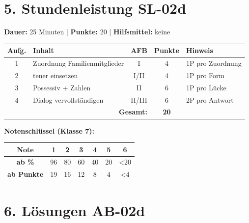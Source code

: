 \documentclass[11pt, a4paper]{article}
\begin{document}

\section*{5. Stundenleistung SL-02d}

\begin{testbox}
\textbf{Dauer:} 25 Minuten | \textbf{Punkte:} 20 | \textbf{Hilfsmittel:} keine

\vspace{1em}

\begin{tabular}{|c|l|c|c|l|}
\hline
\textbf{Aufg.} & \textbf{Inhalt} & \textbf{AFB} & \textbf{Punkte} & \textbf{Hinweis} \\
\hline
1 & Zuordnung Familienmitglieder & I & 4 & 1P pro Zuordnung \\
\hline
2 & tener einsetzen & I/II & 4 & 1P pro Form \\
\hline
3 & Possessiv + Zahlen & II & 6 & 1P pro Lücke \\
\hline
4 & Dialog vervollständigen & II/III & 6 & 2P pro Antwort \\
\hline
\multicolumn{3}{|r|}{\textbf{Gesamt:}} & \textbf{20} & \\
\hline
\end{tabular}
\end{testbox}

\vspace{1em}

\textbf{Notenschlüssel (Klasse 7):}

\begin{tabular}{|c|c|c|c|c|c|c|}
\hline
\textbf{Note} & 1 & 2 & 3 & 4 & 5 & 6 \\
\hline
\textbf{ab \%} & 96 & 80 & 60 & 40 & 20 & <20 \\
\hline
\textbf{ab Punkte} & 19 & 16 & 12 & 8 & 4 & <4 \\
\hline
\end{tabular}


\section*{6. Lösungen AB-02d}
\end{document}
